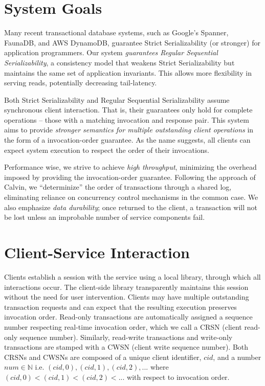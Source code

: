 \documentclass{article}
\begin{document}
\section{System Goals}
\par Many recent transactional database systems, such as Google's Spanner, FaunaDB, and AWS DynamoDB, guarantee Strict Serializability (or stronger) for application programmers. Our system \emph{guarantees Regular Sequential Serializability}, a consistency model that weakens Strict Serializability but maintains the same set of application invariants. This allows more flexibility in serving reads, potentially decreasing tail-latency. 
\par Both Strict Serializability and Regular Sequential Serializability assume synchronous client interaction. That is, their guarantees only hold for complete operations -- those with a matching invocation and response pair. This system aims to provide \emph{stronger semantics for multiple outstanding client operations} in the form of a invocation-order guarantee. As the name suggests, all clients can expect system execution to respect the order of their invocations. 
\par Performance wise, we strive to achieve \emph{high throughput}, minimizing the overhead imposed by providing the invocation-order guarantee. Following the approach of Calvin, we ``determinize'' the order of transactions through a shared log, eliminating reliance on concurrency control mechanisms in the common case. We also emphasize \emph{data durability}; once returned to the client, a transaction will not be lost unless an improbable number of service components fail. 

\section{Client-Service Interaction}
\par Clients establish a session with the service using a local library, through which all interactions occur. The client-side library transparently maintains this session without the need for user intervention. Clients may have multiple outstanding transaction requests and can expect that the resulting execution preserves invocation order. Read-only transactions are automatically assigned a sequence number respecting real-time invocation order, which we call a CRSN (client read-only sequence number). Similarly, read-write transactions and write-only transactions are stamped with a CWSN (client write sequence number). Both CRSNs and CWSNs are composed of a unique client identifier, $cid$, and a number $num \in \mathbb{N}$ i.e. $(cid, 0), (cid, 1), (cid, 2),...$ where $(cid, 0) < (cid, 1) < (cid, 2) < ...$ with respect to invocation order.
\end{document}
